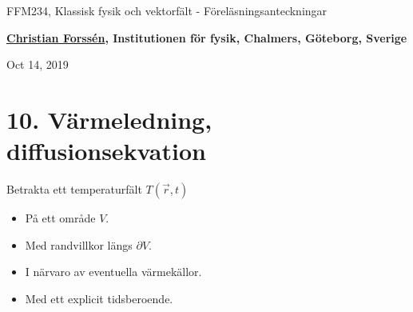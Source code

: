 \documentclass[%
oneside,                 %
final,                   %
10pt]{article}
\begin{document}

\newcommand{\exercisesection}[1]{\subsection*{#1}}







\thispagestyle{empty}

\begin{center}
{\LARGE\bf
\begin{spacing}{1.25}
FFM234, Klassisk fysik och vektorfält - Föreläsningsanteckningar
\end{spacing}
}
\end{center}


\begin{center}
{\bf \href{{http://fy.chalmers.se/subatom/tsp/}}{Christian Forssén}, Institutionen för fysik, Chalmers, Göteborg, Sverige${}^{}$} \\ [0mm]
\end{center}

\begin{center}
\end{center}
    

\begin{center}
Oct 14, 2019
\end{center}

\vspace{1cm}


\section*{10. Värmeledning, diffusionsekvation}

Betrakta ett temperaturfält $T(\vec{r},t)$
\begin{itemize}
\item På ett område $V$.

\item Med randvillkor längs $\partial V$.

\item I närvaro av eventuella värmekällor.

\item Med ett explicit tidsberoende.
\end{itemize}
\end{document}
